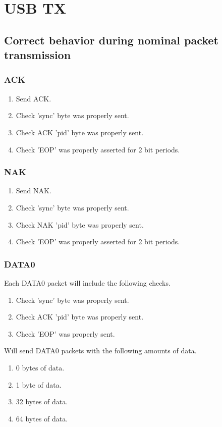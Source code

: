 \documentclass{scrartcl}
\begin{document}
\section{USB TX}
	\subsection{Correct behavior during nominal packet transmission} \label{sec:packet-trans}
		\subsubsection{ACK}
			\begin{enumerate}
            	\item Send ACK.
                \item Check 'sync' byte was properly sent.
                \item Check ACK 'pid' byte was properly sent.
                \item Check 'EOP' was properly asserted for 2 bit periods.
            \end{enumerate}
		\subsubsection{NAK}
			\begin{enumerate}
            	\item Send NAK.
                \item Check 'sync' byte was properly sent.
                \item Check NAK 'pid' byte was properly sent.
                \item Check 'EOP' was properly asserted for 2 bit periods.
            \end{enumerate}
		\subsubsection{DATA0}
        	Each DATA0 packet will include the following checks.
            \begin{enumerate}
            	\item Check 'sync' byte was properly sent.
                \item Check ACK 'pid' byte was properly sent.
                \item Check 'EOP' was properly sent.
            \end{enumerate}
            Will send DATA0 packets with the following amounts of data.
			\begin{enumerate}
            	\item 0 bytes of data.
                \item 1 byte of data.
                \item 32 bytes of data.
                \item 64 bytes of data.
            \end{enumerate}
\end{document}

